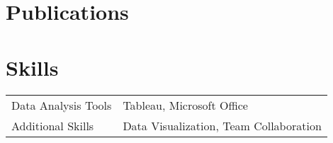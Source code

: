 \documentclass[a4paper,12pt]{article}
\begin{document}
\section{Publications}
\begin{refsection}
\nocite{*}
\printbibliography[heading=none]
\end{refsection}

\section{Skills}
\begin{tabularx}{\linewidth}{@{}l X@{}}
Data Analysis Tools &  \normalsize{Tableau, Microsoft Office} \\
Additional Skills  &  \normalsize{Data Visualization, Team Collaboration} \\  
\end{tabularx}

\vfill
{}
\end{document}
